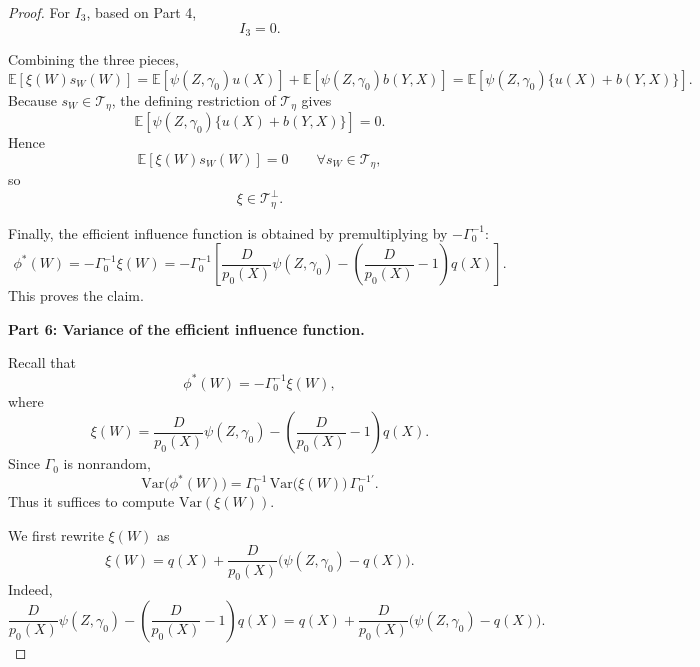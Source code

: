 \documentclass[12pt]{article}
\renewcommand{\(}{\left(}%
\renewcommand{\)}{\right)}%
\renewcommand{\[}{\left[}%
\renewcommand{\]}{\right]}%
\newtheorem{proof}{Proof.}}
\begin{document}
\begin{proof}
For $I_3$, based on Part 4,
\begin{equation*}
I_3=0.
\end{equation*}

Combining the three pieces, 
\begin{equation*}
\mathbb{E}[\xi(W)s_W(W)]
=
\mathbb{E}[\psi(Z,\gamma_0)u(X)]
+
\mathbb{E}[\psi(Z,\gamma_0)b(Y,X)]
=
\mathbb{E}\!\left[\psi(Z,\gamma_0)\{u(X)+b(Y,X)\}\right].
\end{equation*}
Because $s_W\in\mathcal{T}_{\eta}$, the defining restriction of $\mathcal{T}_{\eta}$ gives
\begin{equation*}
\mathbb{E}\!\left[\psi(Z,\gamma_0)\{u(X)+b(Y,X)\}\right]=0.
\end{equation*}
Hence
\begin{equation*}
\mathbb{E}[\xi(W)s_W(W)]=0
\qquad
\forall s_W\in\mathcal{T}_{\eta},
\end{equation*}
so
\begin{equation*}
\xi\in \mathcal{T}_{\eta}^{\perp}.
\end{equation*}

Finally, the efficient influence function is obtained by premultiplying by $-\Gamma_0^{-1}$:
\begin{equation*}
\phi^*(W)
=
-\Gamma_0^{-1}\xi(W)
=
-\Gamma_0^{-1}
\left[
\frac{D}{p_0(X)}\psi(Z,\gamma_0)
-
\left(\frac{D}{p_0(X)}-1\right)q(X)
\right].
\end{equation*}
This proves the claim.

\medskip
\noindent
\textbf{Part 6: Variance of the efficient influence function.}

Recall that
\begin{equation*}
\phi^*(W)=-\Gamma_0^{-1}\xi(W),
\end{equation*}
where
\begin{equation*}
\xi(W)
=
\frac{D}{p_0(X)}\psi(Z,\gamma_0)
-
\left(\frac{D}{p_0(X)}-1\right)q(X).
\end{equation*}
Since $\Gamma_0$ is nonrandom,
\begin{equation*}
\mathrm{Var}\bigl(\phi^*(W)\bigr)
=
\Gamma_0^{-1}\,
\mathrm{Var}\bigl(\xi(W)\bigr)\,
\Gamma_0^{-1'}.
\end{equation*}
Thus it suffices to compute $\mathrm{Var}(\xi(W))$.

We first rewrite $\xi(W)$ as
\begin{equation*}
\xi(W)
=
q(X)+\frac{D}{p_0(X)}\bigl(\psi(Z,\gamma_0)-q(X)\bigr).
\end{equation*}
Indeed,
\begin{equation*}
\frac{D}{p_0(X)}\psi(Z,\gamma_0)
-
\left(\frac{D}{p_0(X)}-1\right)q(X)
=
q(X)+\frac{D}{p_0(X)}\bigl(\psi(Z,\gamma_0)-q(X)\bigr).
\end{equation*}


\end{proof}
\end{document}
